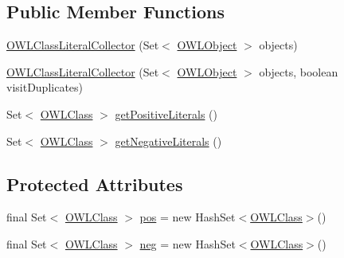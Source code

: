 \subsection*{Public Member Functions}
\begin{DoxyCompactItemize}
\item 
\hyperlink{classorg_1_1semanticweb_1_1owlapi_1_1util_1_1_o_w_l_class_literal_collector_aa01e021b2e86ce830ec3762cf8db11aa}{O\-W\-L\-Class\-Literal\-Collector} (Set$<$ \hyperlink{interfaceorg_1_1semanticweb_1_1owlapi_1_1model_1_1_o_w_l_object}{O\-W\-L\-Object} $>$ objects)
\item 
\hyperlink{classorg_1_1semanticweb_1_1owlapi_1_1util_1_1_o_w_l_class_literal_collector_a534439a6d2fd29a4439782dbc708a6f3}{O\-W\-L\-Class\-Literal\-Collector} (Set$<$ \hyperlink{interfaceorg_1_1semanticweb_1_1owlapi_1_1model_1_1_o_w_l_object}{O\-W\-L\-Object} $>$ objects, boolean visit\-Duplicates)
\item 
Set$<$ \hyperlink{interfaceorg_1_1semanticweb_1_1owlapi_1_1model_1_1_o_w_l_class}{O\-W\-L\-Class} $>$ \hyperlink{classorg_1_1semanticweb_1_1owlapi_1_1util_1_1_o_w_l_class_literal_collector_a391fff0a115334ad1b525389a6bd6116}{get\-Positive\-Literals} ()
\item 
Set$<$ \hyperlink{interfaceorg_1_1semanticweb_1_1owlapi_1_1model_1_1_o_w_l_class}{O\-W\-L\-Class} $>$ \hyperlink{classorg_1_1semanticweb_1_1owlapi_1_1util_1_1_o_w_l_class_literal_collector_a7ccbd44684fd6176ee779660571fe886}{get\-Negative\-Literals} ()
\end{DoxyCompactItemize}
\subsection*{Protected Attributes}
\begin{DoxyCompactItemize}
\item 
final Set$<$ \hyperlink{interfaceorg_1_1semanticweb_1_1owlapi_1_1model_1_1_o_w_l_class}{O\-W\-L\-Class} $>$ \hyperlink{classorg_1_1semanticweb_1_1owlapi_1_1util_1_1_o_w_l_class_literal_collector_a07a73254c2046423d05b1d8958851334}{pos} = new Hash\-Set$<$\hyperlink{interfaceorg_1_1semanticweb_1_1owlapi_1_1model_1_1_o_w_l_class}{O\-W\-L\-Class}$>$()
\item 
final Set$<$ \hyperlink{interfaceorg_1_1semanticweb_1_1owlapi_1_1model_1_1_o_w_l_class}{O\-W\-L\-Class} $>$ \hyperlink{classorg_1_1semanticweb_1_1owlapi_1_1util_1_1_o_w_l_class_literal_collector_a6a855a28c82d1c60e2538fe95cff9edd}{neg} = new Hash\-Set$<$\hyperlink{interfaceorg_1_1semanticweb_1_1owlapi_1_1model_1_1_o_w_l_class}{O\-W\-L\-Class}$>$()
\end{DoxyCompactItemize}
